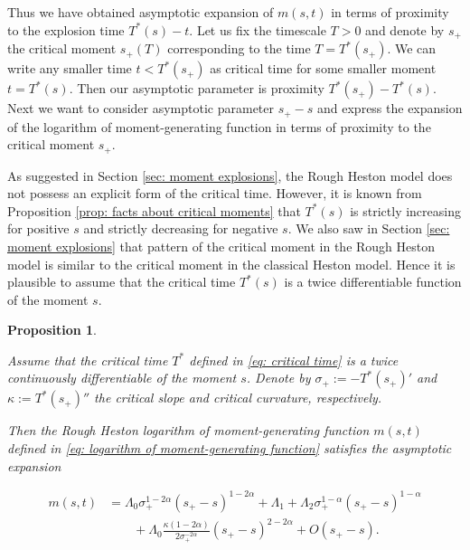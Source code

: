 \documentclass[12pt,twoside]{article}
\theoremstyle{plain}
\theoremstyle{plain}
\newtheorem{proposition}{Proposition}[section]
\theoremstyle{definition}
\theoremstyle{remark}
\numberwithin{equation}{section}
\begin{document}
Thus we have obtained asymptotic expansion of $m(s, t)$ in terms of proximity to the explosion time $T^*(s)-t$. Let us fix the timescale $T>0$ and denote by $s_+$ the critical moment $s_+(T)$ corresponding to the time $T=T^*(s_+)$. We can write any smaller time $t < T^*(s_+)$ as critical time for some smaller moment $t = T^*(s)$. Then our asymptotic parameter is proximity $T^*(s_+) - T^*(s)$. Next we want to consider asymptotic parameter $s_+-s$ and express the expansion of the logarithm of moment-generating function in terms of proximity to the critical moment $s_+$.

As suggested in Section \ref{sec: moment explosions}, the Rough Heston model does not possess an explicit form of the critical time. However, it is known from Proposition \ref{prop: facts about critical moments} that $T^*(s)$ is strictly increasing for positive $s$ and strictly decreasing for negative $s$. We also saw in Section \ref{sec: moment explosions} that pattern of the critical moment in the Rough Heston model is similar to the critical moment in the classical Heston model. Hence it is plausible to assume that the critical time $T^*(s)$ is a twice differentiable function of the moment $s$.

\begin{proposition}
\label{prop: explosion in terms of the critical moments}

Assume that the critical time $T^*$ defined in \eqref{eq: critical time} is a twice continuously differentiable of the moment $s$. Denote by $\sigma_+ := -T^*(s_+)'$ and $\kappa := T^*(s_+)''$ the \emph{critical slope} and \emph{critical curvature}, respectively.

Then the Rough Heston logarithm of moment-generating function $m(s, t)$ defined in \eqref{eq: logarithm of moment-generating function} satisfies the asymptotic expansion

\begin{equation}
\label{eq: expansion of the logarithm of moment-generating function in terms of the critical moment}
\begin{aligned}
m(s,t)&=\Lambda_0 \sigma_+^{1-2\alpha}(s_+-s)^{1-2\alpha} + \Lambda_1 + \Lambda_2\sigma_+^{1-\alpha}(s_+-s)^{1-\alpha} \\[5pt]
&\qquad+ \Lambda_0 \frac{\kappa (1-2\alpha)}{2\sigma_+^{-2\alpha}}(s_+-s)^{2-2\alpha} + O(s_+-s).
\end{aligned}
\end{equation}
\end{proposition}
\end{document}
